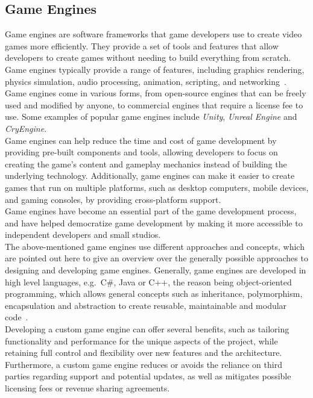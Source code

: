 \subsection{Game Engines}\label{subsec:game-engines}
Game engines are software frameworks that game developers use to create video games more efficiently.
They provide a set of tools and features that allow developers to create games without needing to build everything from scratch.
Game engines typically provide a range of features, including graphics rendering, physics simulation, audio processing, animation, scripting, and networking~\cite{technologies-and-innovation,unity-game-development-terms}.
\\
Game engines come in various forms, from open-source engines that can be freely used and modified by anyone, to commercial engines that require a license fee to use.
Some examples of popular game engines include \textit{Unity}, \textit{Unreal Engine} and \textit{CryEngine}.
\\
Game engines can help reduce the time and cost of game development by providing pre-built components and tools, allowing developers to focus on creating the game's content and gameplay mechanics instead of building the underlying technology.
Additionally, game engines can make it easier to create games that run on multiple platforms, such as desktop computers, mobile devices, and gaming consoles, by providing cross-platform support.
\\
Game engines have become an essential part of the game development process, and have helped democratize game development by making it more accessible to independent developers and small studios.
\\
The above-mentioned game engines use different approaches and concepts, which are pointed out here to give an overview over the generally possible approaches to
designing and developing game engines.
Generally, game engines are developed in high level languages, e.g.~C\#, Java or C++, the reason being object-oriented programming,
which allows general concepts such as inheritance, polymorphism, encapsulation and abstraction to create reusable, maintainable and modular code~\cite{oop}.
\\
Developing a custom game engine can offer several benefits, such as tailoring functionality and performance for the unique aspects of the project, while
retaining full control and flexibility over new features and the architecture.
Furthermore, a custom game engine reduces or avoids the reliance on third parties regarding support and potential updates, as well as mitigates possible
licensing fees or revenue sharing agreements.


